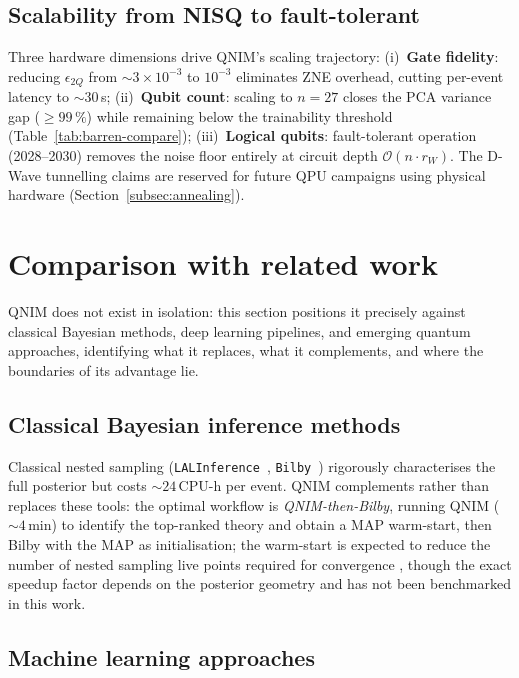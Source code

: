 \documentclass[11pt,a4paper, english]{book}
\theoremstyle{plain}
\theoremstyle{definition}
\numberwithin{equation}{chapter}
\numberwithin{figure}{chapter}
\numberwithin{table}{chapter}
\begin{document}
\subsection{Scalability from NISQ to fault-tolerant}
\label{subsec:disc-ft-scaling}

Three hardware dimensions drive QNIM's scaling trajectory:
(i)~\textbf{Gate fidelity}: reducing $\epsilon_{2Q}$ from 
$\sim\!3\times10^{-3}$ to $10^{-3}$ eliminates ZNE overhead, 
cutting per-event latency to $\sim\!30$\,s;
(ii)~\textbf{Qubit count}: scaling to $n=27$ closes the PCA 
variance gap ($\geq99\,\%$) while remaining below the trainability 
threshold (Table~\ref{tab:barren-compare});
(iii)~\textbf{Logical qubits}: fault-tolerant operation (2028--2030) 
removes the noise floor entirely at circuit depth 
$\mathcal{O}(n \cdot r_W)$.
The D-Wave tunnelling claims are reserved for future QPU campaigns 
using physical hardware (Section~\ref{subsec:annealing}).

\section{Comparison with related work}
\label{sec:disc-comparison}

QNIM does not exist in isolation: this section positions it precisely
against classical Bayesian methods, deep learning pipelines, and
emerging quantum approaches, identifying what it replaces, what it
complements, and where the boundaries of its advantage lie.
\subsection{Classical Bayesian inference methods}
\label{subsec:disc-vs-classical}



Classical nested sampling (\texttt{LALInference}~\cite{Veitch_2015},
\texttt{Bilby}~\cite{Ashton_2019}) rigorously characterises the full
posterior but costs $\sim\!24$\,CPU-h per event.  QNIM complements rather
than replaces these tools: the optimal workflow is \emph{QNIM-then-Bilby},
running QNIM ($\sim\!4$\,min) to identify the top-ranked theory and obtain
a MAP warm-start, then Bilby with the MAP as initialisation; the 
warm-start is expected to reduce the number of 
nested sampling live points required for convergence 
\cite{Veitch_2015}, though the exact speedup factor 
depends on the posterior geometry and has not been 
benchmarked in this work.

\subsection{Machine learning approaches}
\label{subsec:disc-vs-ml}
\end{document}
